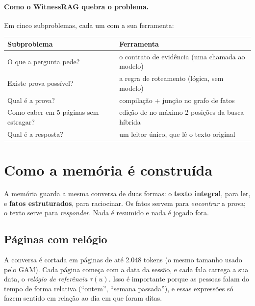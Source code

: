 \documentclass[11pt]{article}
\begin{document}
\paragraph{Como o WitnessRAG quebra o problema.}
Em cinco subproblemas, cada um com a sua ferramenta:
\begin{center}
\small
\begin{tabularx}{\textwidth}{@{}l>{\raggedright\arraybackslash}X@{}}
\toprule
Subproblema & Ferramenta \\
\midrule
O que a pergunta pede? & o contrato de evidência (uma chamada ao modelo) \\
Existe prova possível? & a regra de roteamento (lógica, sem modelo) \\
Qual é a prova? & compilação + junção no grafo de fatos \\
Como caber em 5 páginas sem estragar? & edição de no máximo 2 posições da busca híbrida \\
Qual é a resposta? & um leitor único, que lê o texto original \\
\bottomrule
\end{tabularx}
\end{center}

\section{Como a memória é construída}\label{sec:memoria}

\begin{ideia}
A memória guarda a mesma conversa de duas formas: o \textbf{texto integral},
para ler, e \textbf{fatos estruturados}, para raciocinar. Os fatos servem
para \emph{encontrar} a prova; o texto serve para \emph{responder}. Nada é
resumido e nada é jogado fora.
\end{ideia}

\subsection{Páginas com relógio}

A conversa é cortada em páginas de até 2.048 tokens (o mesmo tamanho usado
pelo GAM). Cada página começa com a data da sessão, e cada fala carrega a sua
data, o \emph{relógio de referência} $\tau(u)$. Isso é importante porque as
pessoas falam do tempo de forma relativa (``ontem'', ``semana passada''), e
essas expressões só fazem sentido em relação ao dia em que foram ditas.
\end{document}

